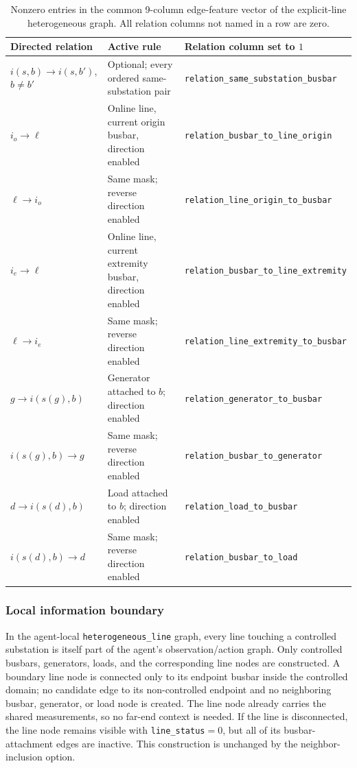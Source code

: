 \begin{table}[H]
  \centering
  \scriptsize
  \caption{Nonzero entries in the common 9-column edge-feature vector of the
  explicit-line heterogeneous graph. All relation columns not named in a row
  are zero.}
  \label{tab:heterogeneous-line-edge-features}
  \setlength{\tabcolsep}{3pt}
  \begin{tabular}{L{0.20\textwidth}L{0.31\textwidth}L{0.38\textwidth}}
    \toprule
    Directed relation & Active rule & Relation column set to $1$ \\
    \midrule
    $i(s,b)\rightarrow i(s,b')$, $b\neq b'$ & Optional; every ordered same-substation pair & \texttt{relation\_same\_substation\_busbar} \\
    $i_o\rightarrow\ell$ & Online line, current origin busbar, direction enabled & \texttt{relation\_busbar\_to\_line\_origin} \\
    $\ell\rightarrow i_o$ & Same mask; reverse direction enabled & \texttt{relation\_line\_origin\_to\_busbar} \\
    $i_e\rightarrow\ell$ & Online line, current extremity busbar, direction enabled & \texttt{relation\_busbar\_to\_line\_extremity} \\
    $\ell\rightarrow i_e$ & Same mask; reverse direction enabled & \texttt{relation\_line\_extremity\_to\_busbar} \\
    $g\rightarrow i(s(g),b)$ & Generator attached to $b$; direction enabled & \texttt{relation\_generator\_to\_busbar} \\
    $i(s(g),b)\rightarrow g$ & Same mask; reverse direction enabled & \texttt{relation\_busbar\_to\_generator} \\
    $d\rightarrow i(s(d),b)$ & Load attached to $b$; direction enabled & \texttt{relation\_load\_to\_busbar} \\
    $i(s(d),b)\rightarrow d$ & Same mask; reverse direction enabled & \texttt{relation\_busbar\_to\_load} \\
    \bottomrule
  \end{tabular}
\end{table}

\subsubsection{Local information boundary}

In the agent-local \texttt{heterogeneous\_line} graph, every line touching a
controlled substation is itself part of the agent's observation/action graph.
Only controlled busbars, generators, loads, and the corresponding line nodes
are constructed. A boundary line node is connected only to its endpoint
busbar inside the controlled domain; no candidate edge to its non-controlled
endpoint and no neighboring busbar, generator, or load node is created. The
line node already carries the shared measurements, so no far-end context is
needed. If the line is disconnected, the line node remains visible with
\texttt{line\_status}$=0$, but all of its busbar-attachment edges are inactive.
This construction is unchanged by the neighbor-inclusion option.

